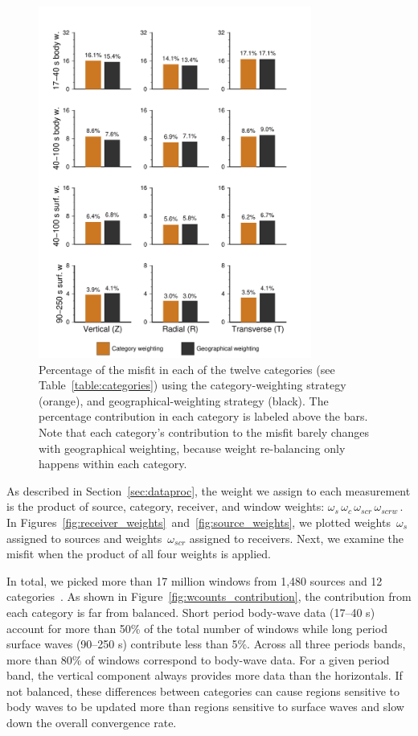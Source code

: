 \begin{figure}
\centering
\includegraphics[width=0.8\textwidth]{ch-weighting/figures/category_misfit_contribution_color.pdf} 
  \caption[Percentage of the misfit in twelve categories]
  {\small{Percentage of the misfit in each of the twelve categories (see Table~\ref{table:categories}) using the category-weighting strategy (orange),
and geographical-weighting 
strategy (black). The percentage contribution in each category is labeled above the bars. Note that each category's contribution to the misfit barely changes with geographical weighting, because weight re-balancing only happens within each category.
}}
\label{fig:weights_histogram}
\end{figure}

As described in Section~\ref{sec:dataproc}, the weight we assign to each measurement is the product of source, category, receiver, 
and window weights: $\omega_{s}\, \omega_{c} \,\omega_{scr}\, \omega_{scrw}$\,.
In Figures~\ref{fig:receiver_weights}~and~\ref{fig:source_weights},
we plotted weights~$\omega_{s}$ assigned to sources and weights~$\omega_{scr}$ assigned to receivers.  
Next, we examine the misfit when the product of all four weights is applied.  

In total, we picked more than 17 million windows from 1,480 sources and 12 categories~\cite{Lei2018}. 
As shown in Figure~\ref{fig:wcounts_contribution}, 
the contribution from each category is far from balanced.  Short period body-wave data (17--40 s)
account for more than 50\% of the total number of windows while long period surface waves (90--250 s) contribute less than 5\%.
Across all three periods bands, more than 80\% of windows correspond to body-wave data.  For a given period band, the vertical component always provides more 
data than the horizontals.
If not balanced, these differences between categories can cause regions 
sensitive to body waves to be updated more than regions sensitive to surface waves and slow down the overall convergence rate.    


